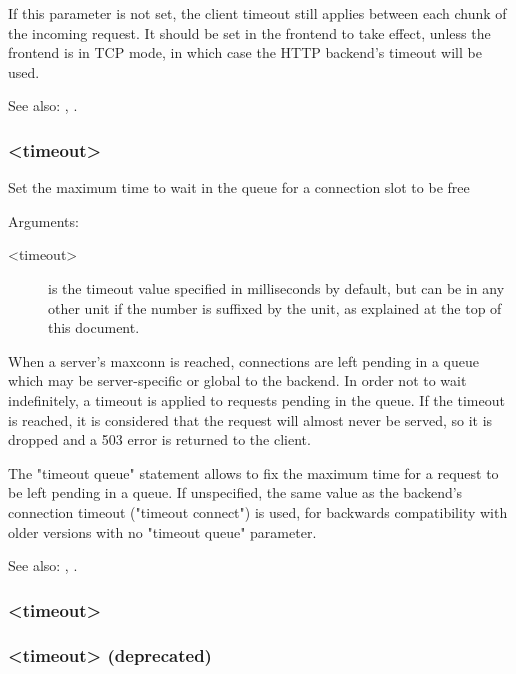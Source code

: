   If this parameter is not set, the client timeout still applies between each
  chunk of the incoming request. It should be set in the frontend to take
  effect, unless the frontend is in TCP mode, in which case the HTTP backend's
  timeout will be used.


See also: , .

\subsubsection[timeout queue]{ <timeout>}

  Set the maximum time to wait in the queue for a connection slot to be free


  Arguments:
  \begin{description}
  \item[<timeout>] is the timeout value specified in milliseconds by default, but
              can be in any other unit if the number is suffixed by the unit,
              as explained at the top of this document.
  \end{description}

  When a server's maxconn is reached, connections are left pending in a queue
  which may be server-specific or global to the backend. In order not to wait
  indefinitely, a timeout is applied to requests pending in the queue. If the
  timeout is reached, it is considered that the request will almost never be
  served, so it is dropped and a 503 error is returned to the client.

  The "timeout queue" statement allows to fix the maximum time for a request to
  be left pending in a queue. If unspecified, the same value as the backend's
  connection timeout ("timeout connect") is used, for backwards compatibility
  with older versions with no "timeout queue" parameter.


See also: , .

\subsubsection[timeout server]{ <timeout>}
\subsubsection[timeout srvtimeout]{ <timeout> (deprecated)}

